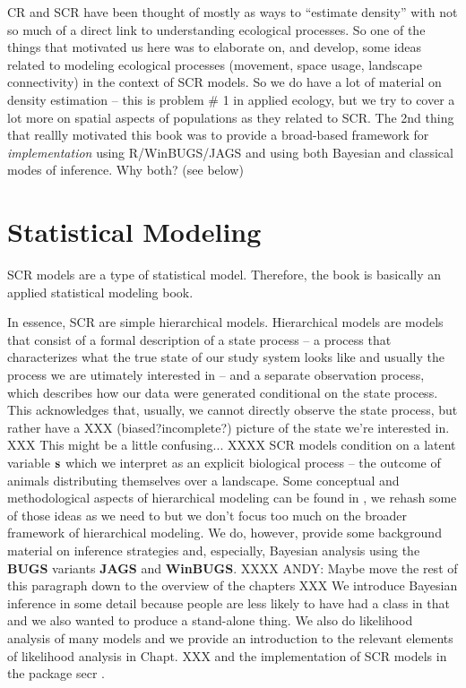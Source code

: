 CR and SCR have been thought of mostly as ways to ``estimate density''
with not so much of a direct link to understanding ecological
processes. So one of the things that motivated us here was to
elaborate on, and develop, some ideas related to modeling ecological
processes (movement, space usage, landscape connectivity) in the
context of SCR models. 
So we do have a lot of material on density estimation -- this is
problem \# 1 in applied ecology, but we try to cover a lot more on
spatial aspects of populations as they related to SCR.
The 2nd thing that reallly motivated this book was to provide a
broad-based framework for {\it implementation} using R/WinBUGS/JAGS and
using both Bayesian and classical modes of inference. 
Why both? (see below) 

\section*{Statistical Modeling}

SCR models are a type of statistical model. Therefore, 
the book is basically an applied statistical modeling book.

In essence, SCR
are simple hierarchical models. 
Hierarchical models are models that consist of a formal description of a state process -- a process that characterizes what the true state of our study system looks like and usually the process we are utimately interested in -- and a separate observation process, which describes how our data were generated conditional on the state process. This acknowledges that, usually, we cannot directly observe the state process, but rather have a XXX (biased?incomplete?) picture of the state we're interested in. XXX This might be a little confusing... XXXX
SCR models condition on a latent variable ${\bf s}$ which we interpret
as an explicit biological process -- the outcome of animals
distributing themselves over a landscape.  Some conceptual and
methodological aspects of hierarchical modeling can be found in
\citet{royle_dorazio:2008}, we rehash some of those ideas as we need
to but we don't focus too much on the broader framework of
hierarchical modeling.
We do, however, 
 provide some background material on inference strategies and,
 especially, Bayesian analysis using the  {\bf BUGS} variants {\bf
   JAGS} and {\bf WinBUGS}. 
XXXX ANDY: Maybe move the rest of this paragraph down to the overview of the chapters XXX 
We introduce Bayesian inference in some
 detail because people are less likely to have had a class in that and
 we also wanted to produce a stand-alone thing.   We also do
 likelihood analysis of many models and we provide an introduction to
 the relevant elements of likelihood analysis in Chapt. XXX and the
 implementation of SCR models in the package secr \citep{efford_etal:2009euring}.

